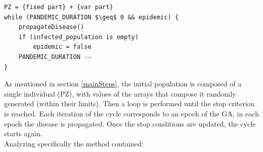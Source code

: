 \documentclass[letterpaper]{article}%
\begin{document}
\lstset{language=Python}
\lstset{frame=lines}
\lstset{basicstyle=\footnotesize}
\lstset{showstringspaces=false}
\lstset{numbers=left}				
\lstset{stepnumber=1}
\begin{lstlisting}[mathescape=true]
PZ = {fixed part} + {var part}
while (PANDEMIC_DURATION $\geq$ 0 && epidemic) {
    propagateDisease()
    if (infected_population is empty)
        epidemic = false
    PANDEMIC_DURATION --
}
\end{lstlisting}
As mentioned in section \ref{mainSteps}, the initial population is composed of a single individual (PZ), with values of the arrays that compose it randomly generated (within their limits). Then a loop is performed until the stop criterion is reached. Each iteration of the cycle corresponds to an epoch of the GA, in each epoch the disease is propagated. Once the stop conditions are updated, the cycle starts again.\\
Analyzing specifically the method contained:
\end{document}
